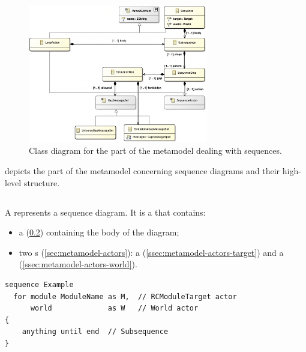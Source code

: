 \begin{figure}
	\centering
	\includegraphics[width=0.7\textwidth]{diagrams/sequences.png}
	\caption{Class diagram for the part of the \langname{} metamodel dealing with sequences.}
	\label{fig:metamodel-sequences}
\end{figure}

 depicts the part of the metamodel concerning
sequence diagrams and their high-level structure.

\subsection{\msequence}

A \msequence{} represents a sequence diagram.  It is a \mnamedelement{}
that contains:

\begin{itemize}
\item
	a \msubsequence{} (\cref{ssec:metamodel-sequences-subsequences})
	containing the body of the diagram;
\item
	two \mactor s (\cref{sec:metamodel-actors}):
	a \mtarget{} (\cref{ssec:metamodel-actors-target})
	and a \mworld{} (\cref{ssec:metamodel-actors-world}).
\end{itemize}

\begin{lstlisting}[style=Example]
sequence Example
  for module ModuleName as M,  // RCModuleTarget actor
      world             as W   // World actor
{
    anything until end  // Subsequence
}
\end{lstlisting}

\subsection{\msubsequence}\label{ssec:metamodel-sequences-subsequences}

